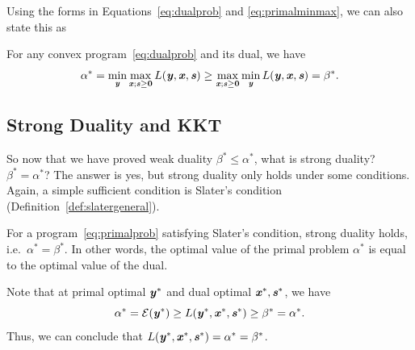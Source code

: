 Using the forms in Equations~\eqref{eq:dualprob} and
\eqref{eq:primalminmax}, we can also state this as
\begin{theorem}
  For any convex program~\eqref{eq:dualprob} and its dual, we have
  \begin{equation*}
  \alpha^* = \min_{\boldsymbol{\mathit{y}}}\max_{\boldsymbol{\mathit{x}}; \boldsymbol{\mathit{s}}\geq\boldsymbol{0}} L(\boldsymbol{\mathit{y}}, \boldsymbol{\mathit{x}}, \boldsymbol{\mathit{s}})
  \geq
  \max_{\boldsymbol{\mathit{x}}; \boldsymbol{\mathit{s}}\geq\boldsymbol{0}} \min_{\boldsymbol{\mathit{y}}} L(\boldsymbol{\mathit{y}}, \boldsymbol{\mathit{x}}, \boldsymbol{\mathit{s}})
  =
  \beta^*
  .
\end{equation*}
\end{theorem}


\subsection{Strong Duality and KKT}
So now that we have proved weak duality $\beta^* \leq \alpha^*$,
what is strong duality? $\beta^* = \alpha^*$?
The answer is yes, but strong duality only holds under some conditions.
Again, a simple sufficient condition is Slater's condition (Definition~\ref{def:slatergeneral}).

\begin{theorem}
  \label{thm:slaterstrongduality}
For a program~\eqref{eq:primalprob} satisfying Slater's condition, strong duality holds, i.e.\ $\alpha^* = \beta^*$.
In other words, the optimal value of the primal problem $\alpha^*$ is
equal to the optimal value of the dual.
\end{theorem}

Note that at primal optimal $\boldsymbol{\mathit{y}}^*$ and dual optimal $\boldsymbol{\mathit{x}}^*,
\boldsymbol{\mathit{s}}^*$, we have
\[
  \alpha^* = \mathcal{E}(\boldsymbol{\mathit{y}}^*) \geq L(\boldsymbol{\mathit{y}}^*, \boldsymbol{\mathit{x}}^*, \boldsymbol{\mathit{s}}^*)
  \geq \beta^* = \alpha^*
  .
\]
Thus, we can conclude that $L(\boldsymbol{\mathit{y}}^*, \boldsymbol{\mathit{x}}^*, \boldsymbol{\mathit{s}}^*) = \alpha^* =
\beta^*$.

